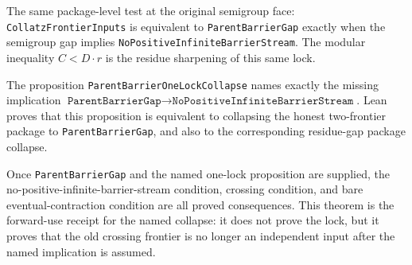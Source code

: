 \begin{theorem}
  \label{thm:collatz-frontier-inputs-parent-gap-collapse}
  \leanok
  The same package-level test at the original semigroup face:
  \texttt{CollatzFrontierInputs} is equivalent to \texttt{ParentBarrierGap} exactly
  when the semigroup gap implies \texttt{NoPositiveInfiniteBarrierStream}. The
  modular inequality \(C<D\cdot r\) is the residue sharpening of this same lock.
\end{theorem}
\begin{theorem}
  \label{thm:collatz-parent-one-lock-collapse}
  \leanok
  The proposition \texttt{ParentBarrierOneLockCollapse} names exactly the missing
  implication \(\texttt{ParentBarrierGap}\to\texttt{NoPositiveInfiniteBarrierStream}\).
  Lean proves that this proposition is equivalent to collapsing the honest
  two-frontier package to \texttt{ParentBarrierGap}, and also to the corresponding
  residue-gap package collapse.
\end{theorem}
\begin{theorem}
  \label{thm:collatz-parent-one-lock-supplies-stream-frontier}
  \leanok
  Once \texttt{ParentBarrierGap} and the named one-lock proposition are supplied,
  the no-positive-infinite-barrier-stream condition, crossing condition, and bare
  eventual-contraction condition are all proved consequences. This theorem is the
  forward-use receipt for the named collapse: it does not prove the lock, but it
  proves that the old crossing frontier is no longer an independent input after
  the named implication is assumed.
\end{theorem}
